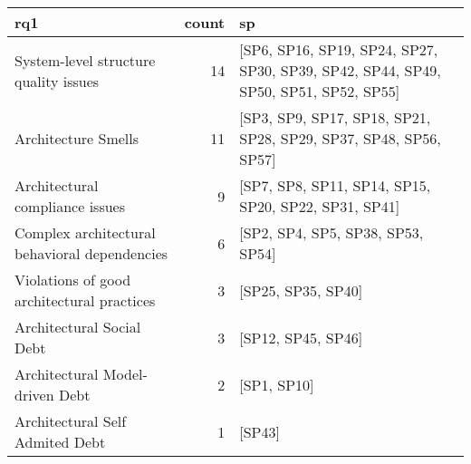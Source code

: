 \begin{tabular}{lrl}
\toprule
                                           rq1 &  count &                                                                                   sp \\
\midrule
         System-level structure quality issues &     14 &  [SP6, SP16, SP19, SP24, SP27, SP30, SP39, SP42, SP44, SP49, SP50, SP51, SP52, SP55] \\
                           Architecture Smells &     11 &                     [SP3, SP9, SP17, SP18, SP21, SP28, SP29, SP37, SP48, SP56, SP57] \\
               Architectural compliance issues &      9 &                                 [SP7, SP8, SP11, SP14, SP15, SP20, SP22, SP31, SP41] \\
 Complex architectural behavioral dependencies &      6 &                                                    [SP2, SP4, SP5, SP38, SP53, SP54] \\
    Violations of good architectural practices &      3 &                                                                   [SP25, SP35, SP40] \\
                     Architectural Social Debt &      3 &                                                                   [SP12, SP45, SP46] \\
               Architectural Model-driven Debt &      2 &                                                                          [SP1, SP10] \\
               Architectural Self Admited Debt &      1 &                                                                               [SP43] \\
\bottomrule
\end{tabular}
